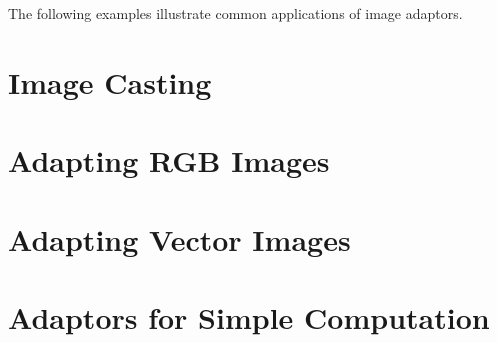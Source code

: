 The following examples illustrate common applications of image adaptors.

\section{Image Casting}
\label{sec:ImageAdaptorForBasicCasting}
\ifitkFullVersion

\fi

\section{Adapting RGB Images}
\label{sec:ImageAdaptorForRGB}
\ifitkFullVersion

\fi


\section{Adapting Vector Images}
\label{sec:ImageAdaptorForVectors}
\ifitkFullVersion

\fi

\section{Adaptors for Simple Computation}
\label{sec:ImageAdaptorForSimpleComputation}
\ifitkFullVersion

\fi



